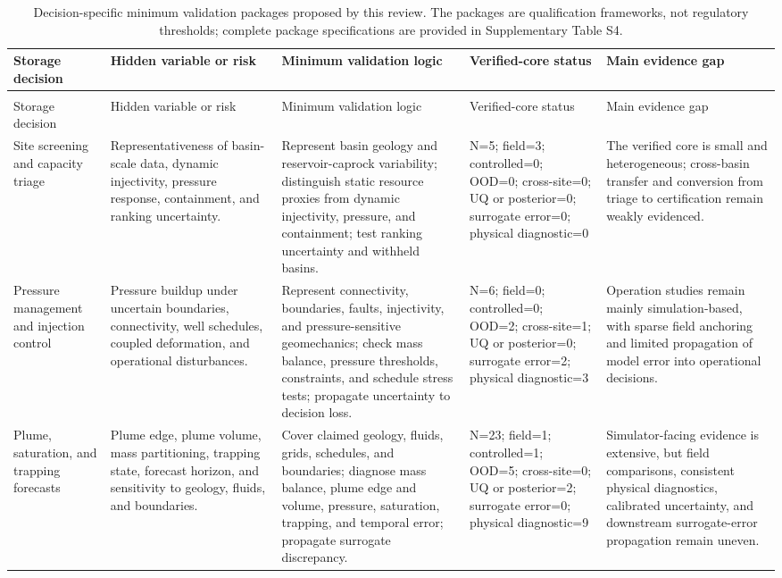 \begingroup
\footnotesize
\setlength{\tabcolsep}{3pt}
\begin{longtable}{>{\RaggedRight\arraybackslash}p{} >{\RaggedRight\arraybackslash}p{} >{\RaggedRight\arraybackslash}p{} >{\RaggedRight\arraybackslash}p{} >{\RaggedRight\arraybackslash}p{}}
\caption{Decision-specific minimum validation packages proposed by this review. The packages are qualification frameworks, not regulatory thresholds; complete package specifications are provided in Supplementary Table S4.}\label{tab:minimum-packages}\\
\toprule
Storage decision & Hidden variable or risk & Minimum validation logic & Verified-core status & Main evidence gap \\
\midrule
\endfirsthead
\multicolumn{5}{c}{\tablename\ \thetable{} -- continued}\\
\toprule
Storage decision & Hidden variable or risk & Minimum validation logic & Verified-core status & Main evidence gap \\
\midrule
\endhead
\bottomrule
\endfoot
Site screening and capacity triage & Representativeness of basin-scale data, dynamic injectivity, pressure response, containment, and ranking uncertainty. & Represent basin geology and reservoir-caprock variability; distinguish static resource proxies from dynamic injectivity, pressure, and containment; test ranking uncertainty and withheld basins. & N=5; field=3; controlled=0; OOD=0; cross-site=0; UQ or posterior=0; surrogate error=0; physical diagnostic=0 & The verified core is small and heterogeneous; cross-basin transfer and conversion from triage to certification remain weakly evidenced. \\
Pressure management and injection control & Pressure buildup under uncertain boundaries, connectivity, well schedules, coupled deformation, and operational disturbances. & Represent connectivity, boundaries, faults, injectivity, and pressure-sensitive geomechanics; check mass balance, pressure thresholds, constraints, and schedule stress tests; propagate uncertainty to decision loss. & N=6; field=0; controlled=0; OOD=2; cross-site=1; UQ or posterior=0; surrogate error=2; physical diagnostic=3 & Operation studies remain mainly simulation-based, with sparse field anchoring and limited propagation of model error into operational decisions. \\
Plume, saturation, and trapping forecasts & Plume edge, plume volume, mass partitioning, trapping state, forecast horizon, and sensitivity to geology, fluids, and boundaries. & Cover claimed geology, fluids, grids, schedules, and boundaries; diagnose mass balance, plume edge and volume, pressure, saturation, trapping, and temporal error; propagate surrogate discrepancy. & N=23; field=1; controlled=1; OOD=5; cross-site=0; UQ or posterior=2; surrogate error=0; physical diagnostic=9 & Simulator-facing evidence is extensive, but field comparisons, consistent physical diagnostics, calibrated uncertainty, and downstream surrogate-error propagation remain uneven. \\

\end{longtable}
